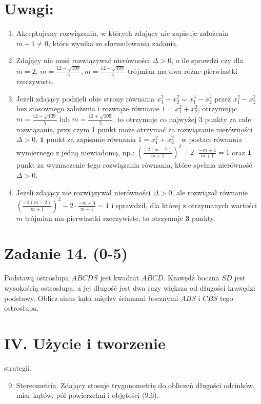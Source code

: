 \documentclass[10pt]{article}
\begin{document}
\section*{Uwagi:}
\begin{enumerate}
  \item Akceptujemy rozwiązania, w których zdający nie zapisuje założenia $m+1 \neq 0$, które wynika ze sformułowania zadania.
  \item Zdający nie musi rozwiązywać nierówności $\Delta>0$, o ile sprawdzi czy dla $m=2$, $m=\frac{12-\sqrt{109}}{5}, m=\frac{12+\sqrt{109}}{5}$ trójmian ma dwa różne pierwiastki rzeczywiste.
  \item Jeżeli zdający podzieli obie strony równania $x_{1}^{2}-x_{2}^{2}=x_{1}^{4}-x_{2}^{4}$ przez $x_{1}^{2}-x_{2}^{2}$ bez stosownego założenia i rozwiąże równanie $1=x_{1}^{2}+x_{2}^{2}$, otrzymując $m=\frac{12-\sqrt{109}}{5}$ lub $m=\frac{12+\sqrt{109}}{5}$, to otrzymuje co najwyżej 3 punkty za całe rozwiązanie, przy czym 1 punkt może otrzymać za rozwiązanie nierówności $\Delta>0$, $\mathbf{1}$ punkt za zapisanie równania $1=x_{1}^{2}+x_{2}^{2} \quad \mathrm{w}$ postaci równania wymiernego z jedną niewiadomą, np.: $\left(\frac{-2(m-2)}{m+1}\right)^{2}-2 \cdot \frac{-m+4}{m+1}=1$ oraz $\mathbf{1}$ punkt za wyznaczenie tego rozwiązania równania, które spełnia nierówność $\Delta>0$.
  \item Jeżeli zdający nie rozwiązywał nierówności $\Delta>0$, ale rozwiązał równanie $\left(\frac{-2(m-2)}{m+1}\right)^{2}-2 \cdot \frac{-m+4}{m+1}=1$ i sprawdził, dla której z otrzymanych wartości $m$ trójmian ma pierwiastki rzeczywiste, to otrzymuje $\mathbf{3}$ punkty.
\end{enumerate}

\section*{Zadanie 14. (0-5)}
Podstawą ostrosłupa $A B C D S$ jest kwadrat $A B C D$. Krawędź boczna $S D$ jest wysokością ostrosłupa, a jej długość jest dwa razy większa od długości krawędzi podstawy. Oblicz sinus kąta między ścianami bocznymi $A B S$ i $C B S$ tego ostrosłupa.

\section*{IV. Użycie i tworzenie}
 strategii.\begin{displayquote}

\begin{enumerate}
  \setcounter{enumi}{8}
  \item Stereometria. Zdający stosuje trygonometrię do obliczeń długości odcinków, miar kątów, pól powierzchni i objętości (9.6).
\end{enumerate}
\end{displayquote}
\end{document}
